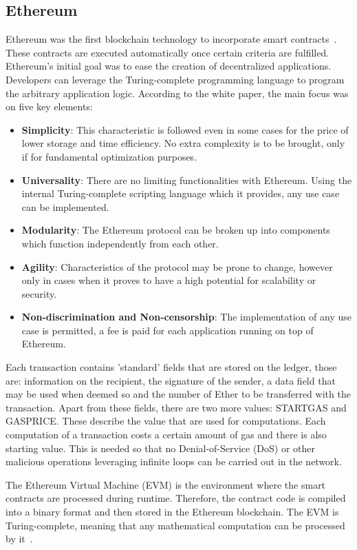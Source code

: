 \clearpage

\subsection{Ethereum}

Ethereum was the first blockchain technology to incorporate smart contracts~\cite{Ethereum}. These contracts are executed automatically once certain criteria are fulfilled.
Ethereum's initial goal was to ease the creation of decentralized applications. Developers can leverage the Turing-complete programming language to program the arbitrary application logic.
According to the white paper, the main focus was on five key elements:
\begin{itemize}
  \item \textbf{Simplicity}: This characteristic is followed even in some cases for the price of lower storage and time efficiency. No extra complexity is to be brought, only if for fundamental optimization purposes.
  \item \textbf{Universality}: There are no limiting functionalities with Ethereum. Using the internal Turing-complete scripting language which it provides, any use case can be implemented.
  \item \textbf{Modularity}: The Ethereum protocol can be broken up into components which function independently from each other.
  \item \textbf{Agility}: Characteristics of the protocol may be prone to change, however only in cases when it proves to have a high potential for scalability or security.
  \item \textbf{Non-discrimination and Non-censorship}: The implementation of any use case is permitted, a fee is paid for each application running on top of Ethereum.
\end{itemize}
Each transaction contains 'standard' fields that are stored on the ledger, those are: information on the recipient, the signature of the sender, a data field that may be used when deemed so and the number of Ether to be transferred with the transaction.
Apart from these fields, there are two more values: STARTGAS and GASPRICE. These describe the value that are used for computations. Each computation of a transaction costs a certain amount of gas and there is also starting value. This is needed so that no Denial-of-Service (DoS) or other malicious operations leveraging infinite loops can be carried out in the network.

The Ethereum Virtual Machine (EVM) is the environment where the smart contracts are processed during runtime. Therefore, the contract code is compiled into a binary format and then stored in the Ethereum blockchain. The EVM is Turing-complete, meaning that any mathematical computation can be processed by it~\cite{Ethereum}.

